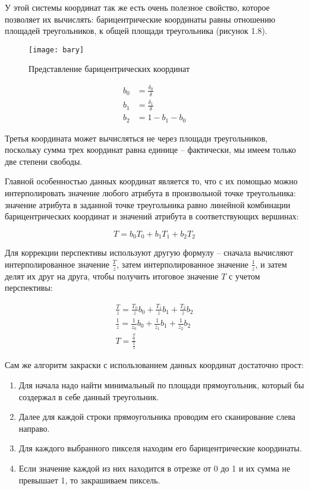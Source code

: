 \documentclass[12pt,a4paper,oneside]{report}
\begin{document}
	
	 У этой системы координат так же есть очень полезное свойство, которое позволяет их вычислять: барицентрические координаты равны отношению площадей треугольников, к общей площади треугольника (рисунок 1.8).
	\begin{figure}[h]
		\centering
		\texttt{[image: bary]}
		\caption{Представление барицентрических координат}
	\end{figure}

	\begin{equation}
	\begin{aligned}
	b_0 &= \frac{\delta_0}{\delta}\\
	b_1 &= \frac{\delta_1}{\delta}\\
	b_2 &= 1 - b_1 - b_0
	\end{aligned}
	\end{equation}
	
	 Третья координата может вычисляться не через площади треугольников, поскольку сумма трех координат равна единице -- фактически, мы имеем только две степени свободы.
	
	 Главной особенностью данных координат является то, что с их помощью можно интерполировать значение любого атрибута в произвольной точке треугольника: значение атрибута в заданной точке треугольника равно линейной комбинации барицентрических координат и значений атрибута в соответствующих вершинах:
	
	\begin{equation}
	T = b_0 T_0 + b_1 T_1 + b_2 T_2
	\end{equation}
	
	 Для коррекции перспективы используют другую формулу -- сначала вычисляют интерполированное значение $\frac{T}{z}$, затем интерполированное значение $\frac{1}{z}$, и затем делят их друг на друга, чтобы получить итоговое значение $T$ с учетом перспективы:
	
	\begin{equation}
	\begin{gathered}
	\frac{T}{z} = \frac{T_0}{z}  b_0 + \frac{T_1}{z}  b_1 + \frac{T_2}{z}  b_2\\
	\frac{1}{z} = \frac{1}{z_0}  b_0 + \frac{1}{z_1}  b_1 + \frac{1}{z_2}  b_2\\
	T = \frac{\frac{T}{z}}{\frac{1}{z}}
	\end{gathered}
	\end{equation}
	
	 Сам же алгоритм закраски с использованием данных координат достаточно прост:
	\begin{enumerate}
		\item Для начала надо найти минимальный по площади прямоугольник, который бы создержал в себе данный треугольник.
		\item Далее для каждой строки прямоугольника проводим его сканирование слева направо.
		\item Для каждого выбранного пикселя находим его барицентрические координаты.
		\item Если значение каждой из них находится в отрезке от 0 до 1 и их сумма не превышает 1, то закрашиваем пиксель.
	\end{enumerate}
\end{document}

